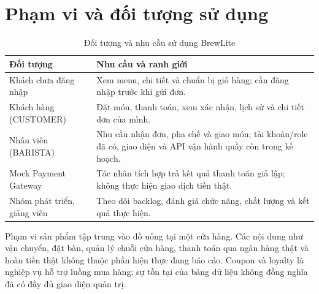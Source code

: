 \section{Phạm vi và đối tượng sử dụng}
\begin{table}[H]
\centering\small
\caption{Đối tượng và nhu cầu sử dụng BrewLite}
\label{tab:actors}
\begin{tabularx}{\textwidth}{@{}L{0.23\textwidth}Y@{}}
\toprule
\textbf{Đối tượng} & \textbf{Nhu cầu và ranh giới} \\
\midrule
Khách chưa đăng nhập & Xem menu, chi tiết và chuẩn bị giỏ hàng; cần đăng nhập trước khi gửi đơn. \\
Khách hàng (CUSTOMER) & Đặt món, thanh toán, xem xác nhận, lịch sử và chi tiết đơn của mình. \\
Nhân viên (BARISTA) & Nhu cầu nhận đơn, pha chế và giao món; tài khoản/role đã có, giao diện và API vận hành quầy còn trong kế hoạch. \\
Mock Payment Gateway & Tác nhân tích hợp trả kết quả thanh toán giả lập; không thực hiện giao dịch tiền thật. \\
Nhóm phát triển, giảng viên & Theo dõi backlog, đánh giá chức năng, chất lượng và kết quả thực hiện. \\
\bottomrule
\end{tabularx}
\end{table}

Phạm vi sản phẩm tập trung vào đồ uống tại một cửa hàng. Các nội dung như
vận chuyển, đặt bàn, quản lý chuỗi cửa hàng, thanh toán qua ngân hàng thật
và hoàn tiền thật không thuộc phần hiện thực đang báo cáo. Coupon và
loyalty là nghiệp vụ hỗ trợ luồng mua hàng; sự tồn tại của bảng dữ liệu
không đồng nghĩa đã có đầy đủ giao diện quản trị.

